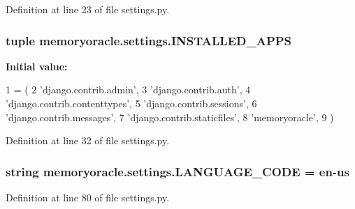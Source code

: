 Definition at line 23 of file settings.\+py.

\hypertarget{namespacememoryoracle_1_1settings_aa30625d00c355a4e99113af5732a1b76}{}
\subsubsection[{I\+N\+S\+T\+A\+L\+L\+E\+D\+\_\+\+A\+P\+P\+S}]{\setlength{\rightskip}{0pt plus 5cm}tuple memoryoracle.\+settings.\+I\+N\+S\+T\+A\+L\+L\+E\+D\+\_\+\+A\+P\+P\+S}\label{namespacememoryoracle_1_1settings_aa30625d00c355a4e99113af5732a1b76}
{\bfseries Initial value\+:}
\begin{DoxyCode}
1 = (
2     \textcolor{stringliteral}{'django.contrib.admin'},
3     \textcolor{stringliteral}{'django.contrib.auth'},
4     \textcolor{stringliteral}{'django.contrib.contenttypes'},
5     \textcolor{stringliteral}{'django.contrib.sessions'},
6     \textcolor{stringliteral}{'django.contrib.messages'},
7     \textcolor{stringliteral}{'django.contrib.staticfiles'},
8     \textcolor{stringliteral}{'memoryoracle'},
9 )
\end{DoxyCode}


Definition at line 32 of file settings.\+py.

\hypertarget{namespacememoryoracle_1_1settings_aa38fcebeba95ab0de566b589068a6aea}{}
\subsubsection[{L\+A\+N\+G\+U\+A\+G\+E\+\_\+\+C\+O\+D\+E}]{\setlength{\rightskip}{0pt plus 5cm}string memoryoracle.\+settings.\+L\+A\+N\+G\+U\+A\+G\+E\+\_\+\+C\+O\+D\+E = \textquotesingle{}en-\/us\textquotesingle{}}\label{namespacememoryoracle_1_1settings_aa38fcebeba95ab0de566b589068a6aea}


Definition at line 80 of file settings.\+py.

\hypertarget{namespacememoryoracle_1_1settings_a22348e05f0743ec99f37a8cf94154efc}{}
